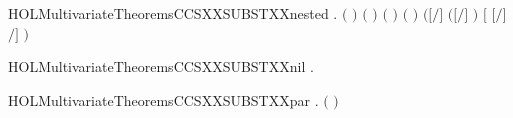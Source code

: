 \newcommand{\HOLMultivariateTheoremsCCSXXSUBSTXXISXXPROC}{\UseVerbatim{HOLMultivariateTheoremsCCSXXSUBSTXXISXXPROC}}
\begin{SaveVerbatim}{HOLMultivariateTheoremsCCSXXSUBSTXXnested}
\HOLTokenTurnstile{} \HOLSymConst{\HOLTokenForall{}}   .
         \HOLSymConst{\HOLTokenConj{}} \ensuremath{(}  \HOLSymConst{\ensuremath{=}}  \ensuremath{)} \HOLSymConst{\HOLTokenConj{}}
       \ensuremath{(}  \HOLSymConst{\ensuremath{=}}  \ensuremath{)} \HOLSymConst{\HOLTokenConj{}}  \ensuremath{(} \ensuremath{)} \ensuremath{(} \ensuremath{)} \HOLSymConst{\HOLTokenImp{}}
       \ensuremath{(}\ensuremath{[}\ensuremath{/}\ensuremath{]} \ensuremath{(}\ensuremath{[}\ensuremath{/}\ensuremath{]} \ensuremath{)} \HOLSymConst{\ensuremath{=}} \ensuremath{[} \ensuremath{[}\ensuremath{/}\ensuremath{]} \ensuremath{/}\ensuremath{]} \ensuremath{)}
\end{SaveVerbatim}
\newcommand{\HOLMultivariateTheoremsCCSXXSUBSTXXnested}{\UseVerbatim{HOLMultivariateTheoremsCCSXXSUBSTXXnested}}
\begin{SaveVerbatim}{HOLMultivariateTheoremsCCSXXSUBSTXXnil}
\HOLTokenTurnstile{} \HOLSymConst{\HOLTokenForall{}}.    \HOLSymConst{\ensuremath{=}} 
\end{SaveVerbatim}
\newcommand{\HOLMultivariateTheoremsCCSXXSUBSTXXnil}{\UseVerbatim{HOLMultivariateTheoremsCCSXXSUBSTXXnil}}
\begin{SaveVerbatim}{HOLMultivariateTheoremsCCSXXSUBSTXXpar}
\HOLTokenTurnstile{} \HOLSymConst{\HOLTokenForall{}}  .
         \ensuremath{(} \HOLSymConst{\ensuremath{\mid}} \ensuremath{)} \HOLSymConst{\ensuremath{=}}
          \HOLSymConst{\ensuremath{\mid}}   
\end{SaveVerbatim}
